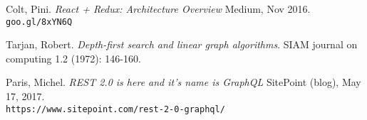 \documentclass[sigconf]{acmart}
\begin{document}
\begin{thebibliography}{9}
\bibitem{} 
Colt, Pini.
\textit{React + Redux: Architecture Overview}
Medium, Nov 2016.
\\\texttt{goo.gl/8xYN6Q}

\bibitem{} 
Tarjan, Robert.
\textit{Depth-first search and linear graph algorithms}.
SIAM journal on computing 1.2 (1972): 146-160.

\bibitem{} 
Paris, Michel.
\textit{REST 2.0 is here and it’s name is GraphQL}
SitePoint (blog), May 17, 2017.
\\\texttt{https://www.sitepoint.com/rest-2-0-graphql/}


\end{thebibliography}
\end{document}
